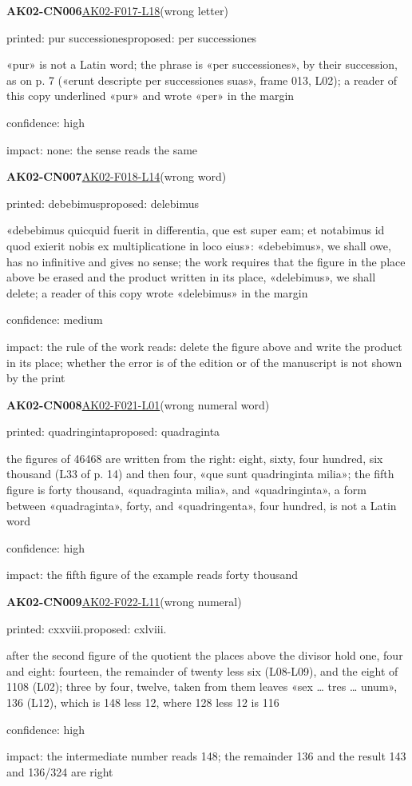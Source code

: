 \documentclass[11pt]{article}
\begin{document}
\noindent\textbf{AK02-CN006}\enspace\hyperlink{AK02-F017-L18}{AK02-F017-L18}\enspace(wrong letter)\par\noindent printed: pur successiones\enspace proposed: per successiones\par\noindent «pur» is not a Latin word; the phrase is «per successiones», by their succession, as on p. 7 («erunt descripte per successiones suas», frame 013, L02); a reader of this copy underlined «pur» and wrote «per» in the margin\par\noindent confidence: high\par\noindent impact: none: the sense reads the same\par\medskip
\noindent\textbf{AK02-CN007}\enspace\hyperlink{AK02-F018-L14}{AK02-F018-L14}\enspace(wrong word)\par\noindent printed: debebimus\enspace proposed: delebimus\par\noindent «debebimus quicquid fuerit in differentia, que est super eam; et notabimus id quod exierit nobis ex multiplicatione in loco eius»: «debebimus», we shall owe, has no infinitive and gives no sense; the work requires that the figure in the place above be erased and the product written in its place, «delebimus», we shall delete; a reader of this copy wrote «delebimus» in the margin\par\noindent confidence: medium\par\noindent impact: the rule of the work reads: delete the figure above and write the product in its place; whether the error is of the edition or of the manuscript is not shown by the print\par\medskip
\noindent\textbf{AK02-CN008}\enspace\hyperlink{AK02-F021-L01}{AK02-F021-L01}\enspace(wrong numeral word)\par\noindent printed: quadringinta\enspace proposed: quadraginta\par\noindent the figures of 46468 are written from the right: eight, sixty, four hundred, six thousand (L33 of p. 14) and then four, «que sunt quadringinta milia»; the fifth figure is forty thousand, «quadraginta milia», and «quadringinta», a form between «quadraginta», forty, and «quadringenta», four hundred, is not a Latin word\par\noindent confidence: high\par\noindent impact: the fifth figure of the example reads forty thousand\par\medskip
\noindent\textbf{AK02-CN009}\enspace\hyperlink{AK02-F022-L11}{AK02-F022-L11}\enspace(wrong numeral)\par\noindent printed: cxxviii.\enspace proposed: cxlviii.\par\noindent after the second figure of the quotient the places above the divisor hold one, four and eight: fourteen, the remainder of twenty less six (L08-L09), and the eight of 1108 (L02); three by four, twelve, taken from them leaves «sex … tres … unum», 136 (L12), which is 148 less 12, where 128 less 12 is 116\par\noindent confidence: high\par\noindent impact: the intermediate number reads 148; the remainder 136 and the result 143 and 136/324 are right\par\medskip
\end{document}
